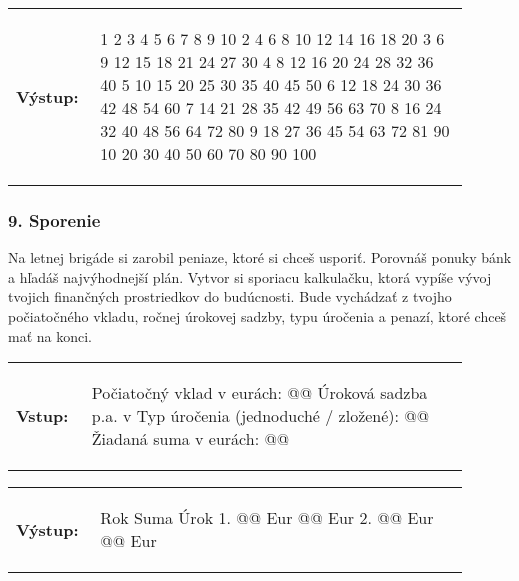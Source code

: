 \begin{tabular}{@{}p{0.15\linewidth}p{0.75\linewidth}}
\textbf{\small Výstup:} &
\vspace{-3em}
\begin{code}
   1   2   3   4   5   6   7   8   9  10
   2   4   6   8  10  12  14  16  18  20
   3   6   9  12  15  18  21  24  27  30
   4   8  12  16  20  24  28  32  36  40
   5  10  15  20  25  30  35  40  45  50
   6  12  18  24  30  36  42  48  54  60
   7  14  21  28  35  42  49  56  63  70
   8  16  24  32  40  48  56  64  72  80
   9  18  27  36  45  54  63  72  81  90
  10  20  30  40  50  60  70  80  90 100
\end{code}
\end{tabular}
\vspace{-2em}


\subsubsection*{9. Sporenie}
Na letnej brigáde si zarobil peniaze, ktoré si chceš usporiť. Porovnáš ponuky bánk a hľadáš najvýhodnejší plán. Vytvor si sporiacu kalkulačku, ktorá vypíše vývoj tvojich finančných prostriedkov do budúcnosti. Bude vychádzať z tvojho počiatočného vkladu, ročnej úrokovej sadzby, typu úročenia a penazí, ktoré chceš mať na konci. 

\begin{tabular}{@{}p{0.15\linewidth}p{0.75\linewidth}}
\textbf{\small Vstup:} &
\vspace{-3em}
\begin{code}
Počiatočný vklad v eurách: @\fbox{\phantom{vstup}}@
Úroková sadzba p.a. v %
Typ úročenia (jednoduché / zložené): @\fbox{\phantom{vstup}}@
Žiadaná suma v eurách: @\fbox{\phantom{vstup}}@
\end{code}
\end{tabular}

\vspace{-2em}
\begin{tabular}{@{}p{0.15\linewidth}p{0.75\linewidth}}
\textbf{\small Výstup:} &
\vspace{-3em}
\begin{code}
Rok      Suma						Úrok
  1.		@\fbox{\phantom{vstup}}@ Eur	@\fbox{\phantom{vstup}}@ Eur
  2.		@\fbox{\phantom{vstup}}@ Eur	@\fbox{\phantom{vstup}}@ Eur
\end{code}
\end{tabular}
\vspace{-2em}
